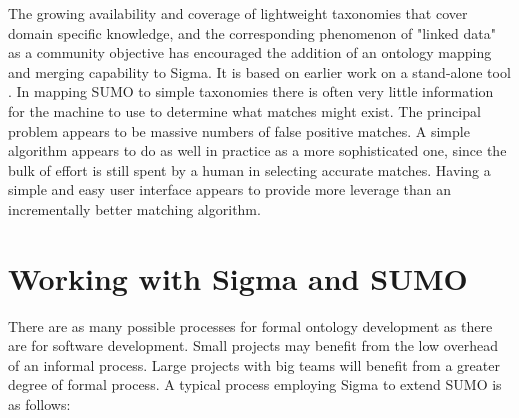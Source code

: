 \documentclass{book}
\begin{document}
The growing availability and coverage of lightweight taxonomies that cover
domain specific knowledge, and the corresponding phenomenon of "linked data" as a community objective has encouraged the addition of an
ontology mapping and merging capability to Sigma.  It is based on earlier work
on a stand-alone tool \cite{li2004lom}.  In mapping SUMO to simple taxonomies
there is often very little information for the machine to use to determine what
matches might exist. The principal problem appears to be massive numbers of
false positive matches. A simple algorithm appears to do as well in practice as
a more sophisticated one, since the bulk of effort is still spent by a human in
selecting accurate matches.  Having a simple and easy user interface appears to
provide more leverage than an incrementally better matching algorithm. 


\section{Working with Sigma and SUMO}
\label{chap:KnowEngi:sec:Work}

There are as many possible processes for formal ontology development as there
are for software development.  Small projects may benefit from the low overhead
of an informal process.  Large projects with big teams will benefit from a
greater degree of formal process.  A typical process employing Sigma to extend
SUMO is as follows:
\end{document}
